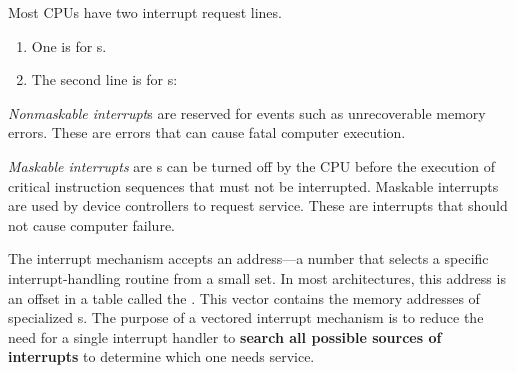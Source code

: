 Most CPUs have two interrupt request lines.
\begin{enumerate}[noitemsep]
\item One is for s.
\item The second line is for s:
\end{enumerate}

\begin{definition}\label{def:Nonmaskable_Interrupt}
  \emph{Nonmaskable interrupt}s are reserved for events such as unrecoverable memory errors.
  These are errors that can cause fatal computer execution.
\end{definition}

\begin{definition}\label{def:Maskable_Interrupt}
  \emph{Maskable interrupts} are s can be turned off by the CPU before the execution of critical instruction sequences that must not be interrupted.
  Maskable interrupts are used by device controllers to request service.
  These are interrupts that should not cause computer failure.
\end{definition}

The interrupt mechanism accepts an address—a number that selects a specific interrupt-handling routine from a small set.
In most architectures, this address is an offset in a table called the .
This vector contains the memory addresses of specialized s.
The purpose of a vectored interrupt mechanism is to reduce the need for a single interrupt handler to \textbf{search all possible sources of interrupts} to determine which one needs service.



